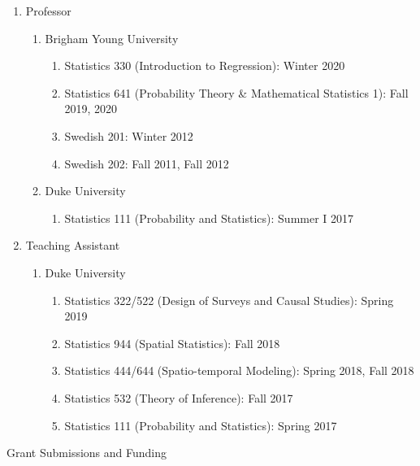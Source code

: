 \documentclass[12pt]{article}
\newcommand{\head}[1]{ %
    \bigskip %
    \begin{large}\begin{bf}{#1}\end{bf}\end{large} %

    \ \\ [-1.3cm] %

    \hrulefill}
\begin{document}
\begin{enumerate}[label=$\bullet$]
\item Professor
\begin{enumerate}[label=$\cdot$]
\item Brigham Young University
\begin{enumerate}[label=$\cdot$]
\item Statistics 330 (Introduction to Regression): Winter 2020
\item Statistics 641 (Probability Theory \& Mathematical Statistics 1): Fall 2019, 2020
\item Swedish 201: Winter 2012 
\item Swedish 202: Fall 2011, Fall 2012
\end{enumerate}
\item Duke University
\begin{enumerate}[label=$\cdot$]
\item Statistics 111 (Probability and Statistics): Summer I 2017
\end{enumerate}
\end{enumerate}
\item Teaching Assistant
\begin{enumerate}[label=$\cdot$]
\item Duke University
\begin{enumerate}[label=$\cdot$]
\item Statistics 322/522 (Design of Surveys and Causal Studies): Spring 2019
\item Statistics 944 (Spatial Statistics): Fall 2018
\item Statistics 444/644 (Spatio-temporal Modeling): Spring 2018, Fall 2018
\item Statistics 532 (Theory of Inference): Fall 2017
\item Statistics 111 (Probability and Statistics): Spring 2017 
\end{enumerate}
\end{enumerate}
\end{enumerate}

\head{Grant Submissions and Funding}
\end{document}
